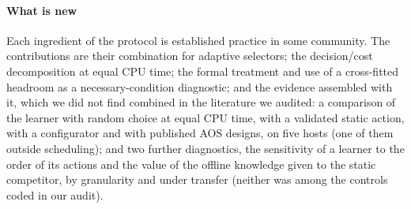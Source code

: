 \paragraph{What is new} Each ingredient of the protocol is established practice in some community. The contributions are their combination for adaptive selectors; the decision/cost decomposition at equal CPU time; the formal treatment and use of a cross-fitted headroom as a necessary-condition diagnostic; and the evidence assembled with it, which we did not find combined in the literature we audited: a comparison of the learner with random choice at equal CPU time, with a validated static action, with a configurator and with published AOS designs, on five hosts (one of them outside scheduling); and two further diagnostics, the sensitivity of a learner to the order of its actions and the value of the offline knowledge given to the static competitor, by granularity and under transfer (neither was among the controls coded in our audit).
